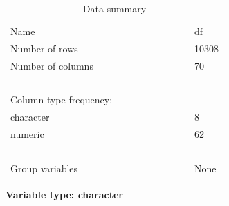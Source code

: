 \documentclass[
  letterpaper,
  DIV=11,
  numbers=noendperiod]{scrreprt}
\begin{document}
\begin{longtable}[]{@{}ll@{}}
\caption{Data summary}\tabularnewline
\toprule()
\endhead
Name & df \\
Number of rows & 10308 \\
Number of columns & 70 \\
\_\_\_\_\_\_\_\_\_\_\_\_\_\_\_\_\_\_\_\_\_\_\_ & \\
Column type frequency: & \\
character & 8 \\
numeric & 62 \\
\_\_\_\_\_\_\_\_\_\_\_\_\_\_\_\_\_\_\_\_\_\_\_\_ & \\
Group variables & None \\
\bottomrule()
\end{longtable}

\textbf{Variable type: character}
\end{document}
